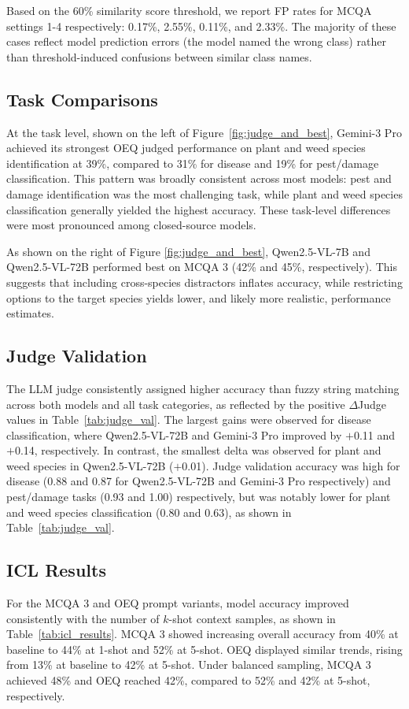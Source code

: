 \documentclass[10pt,letterpaper]{article}
\begin{document}
Based on the 60\% similarity score threshold, we report FP rates for MCQA settings 1-4 respectively: 0.17\%, 2.55\%, 0.11\%, and 2.33\%. The majority of these cases reflect model prediction errors (the model named the wrong class) rather than threshold-induced confusions between similar class names.

\subsection{Task Comparisons}
At the task level, shown on the left of Figure~\ref{fig:judge_and_best}, Gemini-3 Pro achieved its strongest OEQ judged performance on plant and weed species identification at 39\%, compared to 31\% for disease and 19\% for pest/damage classification. This pattern was broadly consistent across most models: pest and damage identification was the most challenging task, while plant and weed species classification generally yielded the highest accuracy. These task-level differences were most pronounced among 
closed-source models.

As shown on the right of Figure \ref{fig:judge_and_best}, Qwen2.5-VL-7B and Qwen2.5-VL-72B performed best on MCQA 3 (42\% and 45\%, respectively). This suggests that including cross-species distractors inflates accuracy, while restricting options to the target species yields lower, and likely more realistic, performance estimates.

\subsection{Judge Validation}
The LLM judge consistently assigned higher accuracy than fuzzy string matching across both models and all task categories, as reflected by the positive $\Delta$Judge values in Table~\ref{tab:judge_val}. The largest gains were observed for disease classification, where Qwen2.5-VL-72B and Gemini-3 Pro improved by $+$0.11 and $+$0.14, respectively. In contrast, the smallest delta was observed for plant and weed species in Qwen2.5-VL-72B ($+$0.01). Judge validation accuracy was high for disease (0.88 and 0.87 for Qwen2.5-VL-72B and Gemini-3 Pro respectively) and pest/damage tasks (0.93 and 1.00) respectively, but was notably lower for plant and weed species classification (0.80 and 0.63), as shown in Table~\ref{tab:judge_val}.

\subsection{ICL Results}
For the MCQA 3 and OEQ prompt variants, model accuracy improved consistently with the number of $k$-shot context samples, as shown in Table~\ref{tab:icl_results}. MCQA 3 showed increasing overall accuracy from 40\% at baseline to 44\% at 1-shot and 52\% at 5-shot. OEQ displayed similar trends, rising from 13\% at baseline to 42\% at 5-shot. Under balanced sampling, MCQA 3 achieved 48\% and OEQ reached 42\%, compared to 52\% and 42\% at 5-shot, respectively.
\end{document}
